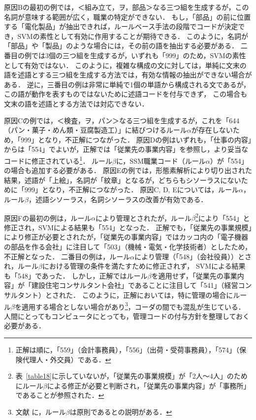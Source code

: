 \documentclass[japanese]{jnlp_1.4}
\begin{document}
原因Bの最初の例では，＜組み立て，ヲ，部品＞なる三つ組を生成するが，この名詞が意味する範囲が広く，職業の特定ができない．
もし，「部品」の前に位置する「電化製品」が抽出できれば，ルールベース手法の段階でコードが決定でき，SVMの素性として有効に作用することが期待できる．
このように，名詞が「部品」や「製品」のような場合には，その前の語を抽出する必要がある．
二番目の例では3個の三つ組を生成するが，いずれも「999」のため，SVMの素性として有効ではない． 
このように，複雑な構成の文に対しては，単純に文末の語を述語とする三つ組を生成する方法では，有効な情報の抽出ができない場合がある．
逆に，三番目の例は非常に単純で1個の単語から構成される文であるが，この語が動作を表すものではないために述語コードを付与できず， この場合も文末の語を述語とする方法では対応できない．

原因Cの例では，＜検査，ヲ，パン＞なる三つ組を生成するが，これを「644（パン・菓子・めん類・豆腐製造工）」に結びつけるルール$\alpha$が存在しないため，「999」となり，不正解につながった．
原因Dの例はいずれも，「仕事の内容」からは「554」でよいが，正解では「従業先の事業内容」を参照し，より妥当なコードに修正されている\footnote{正解は順に，「559」（会計事務員），「556」（出荷・受荷事務員），「574」（保険代理人・外交員）である．}．
ルール$\beta$に，SSM職業コード（ルール$\alpha$）が「554」の場合も追加する必要がある．
原因Eの例では，形態素解析により切り出された結果，述語が「上絵」，名詞が「紋章」となるが，どちらもシソーラスにないために「999」となり，不正解につながった．
原因C, D, Eについては，ルール$\alpha$，ルール$\beta$，述語シソーラス，名詞シソーラスの改善が有効である．

原因Fの最初の例は，ルール$\alpha$により管理とされたが，ルール$\beta$\footnote{表~\ref{table18}に示していないが，「従業先の事業規模」が「2人〜4人」のためにルール$\beta$による修正が必要と判断され，「従業先の事業内容」が「事務所」であることが参照された．}により「554」と修正され，SVMによる結果も「554」となった．
正解でも，「従業先の事業規模」により修正が必要とされたが，「従業先の事業内容」ではカッコ内の「電子機器の部品を作る会社」に注目して「503」（機械・電気・化学技術者）としたため，不正解となった．
二番目の例は，ルール$\alpha$により管理（「548」（会社役員））とされ，ルール$\beta$における管理の条件を満たすために修正されず， SVMによる結果も「548」であった．
しかし，正解ではルール$\beta$を適用せず，「従業先の事業内容」が「建設住宅コンサルタント会社」であることに注目して「541」（経営コンサルタント）とされた．
このように，正解においては，特に管理の場合にルール$\beta$を適用する場合としない場合があり\footnote{文献 \cite{SSM95}に，ルール$\beta$は原則であるとの説明がある．}，コーダの間でも混乱が生じている．
人間にとってもコンピュータにとっても，管理コードの付与方針を整理しておく必要がある． 
\end{document}
